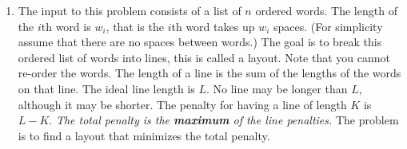 \documentclass{article}
\begin{document}
\begin{enumerate}[label=(\alph*)]
\begin{proof}
        	With this contradiction, we have that $A$ is correct.
        \end{proof}
        
        
        \item The input to this problem consists of a list of $n$ ordered words.
        The length of the $i$th word is $w_i$, that is the $i$th word takes up $w_i$ spaces.
        (For simplicity assume that there are no spaces between words.)
        The goal is to break this ordered list of words into lines, this is called a layout.
        Note that you cannot re-order the words.
        The length of a line is the sum of the lengths of the words on that line.
        The ideal line length is $L$.
        No line may be longer than $L$, although it may be shorter.
        The penalty for having a line of length $K$ is $L - K$.
        \emph{The total penalty is the \textbf{maximum} of the line penalties.}
        The problem is to find a layout that minimizes the total penalty.
        
        
    \end{enumerate}
\end{document}
